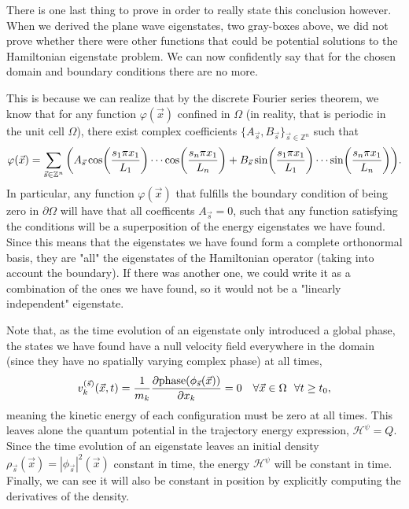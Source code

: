 \documentclass[11pt, a4paper]{article} %
\newcommand{\Z}{\mathbb{Z}} %
\newcommand{\h}{\mathcal{H}}
\DeclareRobustCommand{\mybox}[2][gray!10]{%
\begin{tcolorbox}[   %
        left=0.2cm,
        right=0.2cm,
        top=0.15cm,
        bottom=0.15cm,
        colback=#1,
        colframe=#1,
        width=\dimexpr\textwidth\relax, 
        enlarge left by=0mm,
        boxsep=5pt,
        arc=0pt,outer arc=0pt,
        ]
        #2
\end{tcolorbox}
}
\begin{document}
There is one last thing to prove in order to really state this conclusion however. When we derived the plane wave eigenstates, two gray-boxes above, we did not prove whether there were other functions that could be potential solutions to the Hamiltonian eigenstate problem. We can now confidently say that for the chosen domain and boundary conditions there are no more.

\mybox{
This is because we can realize that by the discrete Fourier series theorem, we know that for any function $\varphi(\vec{x})$ confined in $\Omega$ (in reality, that is periodic in the unit cell $\Omega$), there exist complex coefficients $\{A_{\vec{s}}, B_{\vec{s}}\}_{\vec{s}\in\Z^n}$ such that
\begin{equation}
\varphi(\vec{x})=\sum_{\vec{s}\in\Z^n}\qty(A_{\vec{s}}\cos(\frac{s_1\pi x_1}{L_1})\cdots \cos(\frac{s_n\pi x_1}{L_n})+ B_{\vec{s}}\sin(\frac{s_1\pi x_1}{L_1})\cdots \sin(\frac{s_n\pi x_1}{L_n})).
\end{equation}
In particular, any function $\varphi(\vec{x})$ that fulfills the boundary condition of being zero in $\partial \Omega$ will have that all coefficents $A_{\vec{s}}=0$, such that any function satisfying the conditions will be a superposition of the energy eigenstates we have found. Since this means that the eigenstates we have found form a complete orthonormal basis, they are "all" the eigenstates of the Hamiltonian operator (taking into account the boundary). If there was another one, we could write it as a combination of the ones we have found, so it would not be a "linearly independent" eigenstate.
}

Note that, as the time evolution of an eigenstate only introduced a global phase, the states we have found have a null velocity field everywhere in the domain (since they have no spatially varying complex phase) at all times,
\begin{equation}
v_k^{(\vec{s})}(\vec{x},t)=\frac{1}{m_k}\pdv{\text{phase}(\phi_{\vec{s}}(\vec{x}))}{x_k}=0\quad  \forall \vec{x}\in\Omega\ \ \forall t\geq t_0,
\end{equation}
meaning the kinetic energy of each configuration must be zero at all times. This leaves alone the quantum potential in the trajectory energy expression, $\h^\psi=Q$. Since the time evolution of an eigenstate leaves an initial density $\rho_{\vec{s}}(\vec{x})=|\phi_{\vec{s}}|^2(\vec{x})$ constant in time, the energy $\h^\psi$ will be constant in time. Finally, we can see it will also be constant in position by explicitly computing the derivatives of the density.
\end{document}
